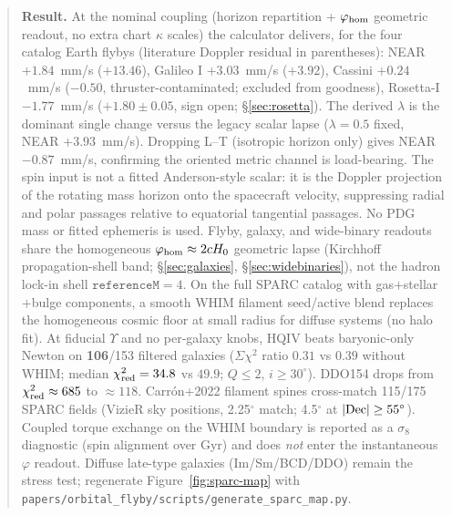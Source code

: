 \documentclass[11pt]{amsart}
\begin{document}
\begin{abstract}
\noindent\textbf{Result.}
At the nominal coupling (horizon repartition + $\varphi_{\rm hom}$ geometric readout, no
extra chart $\kappa$ scales) the calculator
delivers, for the four catalog Earth flybys (literature Doppler residual in parentheses):
NEAR $+1.84$~mm/s ($+13.46$),
Galileo I $+3.03$~mm/s ($+3.92$),
Cassini $+0.24$~mm/s ($-0.50$, thruster-contaminated; excluded from goodness),
Rosetta-I $-1.77$~mm/s ($+1.80\pm0.05$, sign open; \S\ref{sec:rosetta}).
The derived $\lambda$ is the dominant single change versus the legacy scalar lapse
($\lambda=0.5$ fixed, NEAR $+3.93$~mm/s). Dropping L--T (isotropic horizon only) gives
NEAR $-0.87$~mm/s, confirming the oriented metric channel is load-bearing. The spin input is not a fitted Anderson-style scalar: it is the
Doppler projection of the rotating mass horizon onto the spacecraft velocity, suppressing
radial and polar passages relative to equatorial tangential passages. No PDG mass or fitted
ephemeris is used. Flyby, galaxy, and wide-binary readouts share the homogeneous
$\varphi_{\rm hom}\approx 2cH_0$ geometric lapse (Kirchhoff propagation-shell band;
\S\ref{sec:galaxies}, \S\ref{sec:widebinaries}), not the hadron lock-in shell
$\texttt{referenceM}=4$.
On the full SPARC catalog \cite{lelli2016sparc} with gas$+$stellar$+$bulge components,
a smooth WHIM filament seed/active blend replaces the homogeneous cosmic floor at small
radius for diffuse systems (no halo fit). At fiducial $\Upsilon$ and no per-galaxy
knobs, HQIV beats baryonic-only Newton on \textbf{106}/153 filtered galaxies
($\Sigma\chi^2$ ratio $0.31$ vs $0.39$ without WHIM; median $\chi^2_{\rm red}=34.8$
vs $49.9$; $Q\le 2$, $i\ge 30^\circ$). DDO154 drops from $\chi^2_{\rm red}\approx 685$ to $\approx 118$.
Carrón+2022 filament spines \cite{carron2022filaments} cross-match 115/175 SPARC
fields (VizieR sky positions, 2.25$^\circ$ match; 4.5$^\circ$ at $|{\rm Dec}|\ge 55^\circ$).
Coupled torque exchange on the WHIM boundary is reported as a $\sigma_8$ diagnostic
(spin alignment over Gyr) and does \emph{not} enter the instantaneous $\varphi$ readout.
Diffuse late-type galaxies (Im/Sm/BCD/DDO) remain the stress test; regenerate
Figure~\ref{fig:sparc-map} with \texttt{papers/orbital\_flyby/scripts/generate\_sparc\_map.py}.
\end{abstract}
\maketitle


\end{document}
